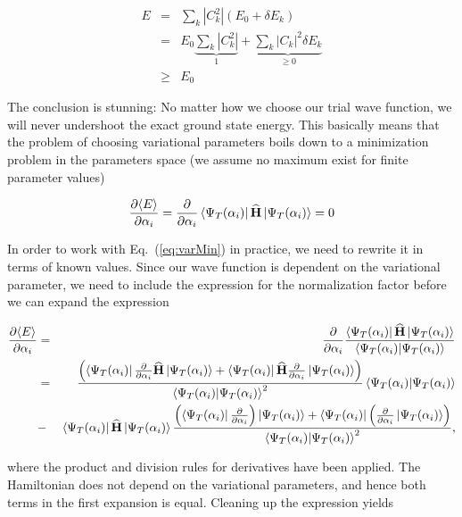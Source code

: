 \begin{eqnarray*}
 E   &=& \sum_k |C_k^2| (E_0 + \delta E_k) \\
     &=& E_0 \underbrace{\sum_k |C_k^2|}_{1} + \underbrace{\sum_k |C_k|^2\delta E_k}_{\ge 0} \\
     &\ge& E_0
\end{eqnarray*}

The conclusion is stunning: No matter how we choose our trial wave function, we will never undershoot the exact ground state energy. This basically means that the problem of choosing variational parameters boils down to a minimization problem in the parameters space (we assume no maximum exist for finite parameter values)

\begin{equation}
\label{eq:varMin}
\frac{\partial \langle E\rangle}{\partial \alpha_i} = \frac{\partial}{\partial \alpha_i}\left< \Psi_T(\alpha_i) \right|{\bf\widehat{H}}\left| \Psi_T(\alpha_i) \right> = 0
\end{equation}

In order to work with Eq.~(\ref{eq:varMin}) in practice, we need to rewrite it in terms of known values. Since our wave function is dependent on the variational parameter, we need to include the expression for the normalization factor before we can expand the expression

\newcommand{\Norm}{\braket{\Psi_T(\alpha_i)}{\Psi_T(\alpha_i)}}

\begin{eqnarray*}
 \frac{\partial \langle E\rangle}{\partial \alpha_i}  &=& \frac{\partial}{\partial \alpha_i} \frac{\bra{\Psi_T(\alpha_i)}\OP{H}\ket{\Psi_T(\alpha_i)}}{\Norm} \\
 &=& \frac{\left(\bra{\Psi_T(\alpha_i)}\frac{\partial}{\partial \alpha_i}\OP{H}\ket{\Psi_T(\alpha_i)} + \bra{\Psi_T(\alpha_i)}\OP{H}\frac{\partial}{\partial \alpha_i}\ket{\Psi_T(\alpha_i)}\right)}{\Norm^2}\Norm \\
 &-& \bra{\Psi_T(\alpha_i)}\OP{H}\ket{\Psi_T(\alpha_i)}\frac{\left(\bra{\Psi_T(\alpha_i)}\frac{\partial}{\partial \alpha_i}\right)\ket{\Psi_T(\alpha_i)} + \bra{\Psi_T(\alpha_i)}\left(\frac{\partial}{\partial \alpha_i}\ket{\Psi_T(\alpha_i)}\right)}{\Norm^2},\\
\end{eqnarray*}

where the product and division rules for derivatives have been applied. The Hamiltonian does not depend on the variational parameters, and hence both terms in the first expansion is equal. Cleaning up the expression yields


